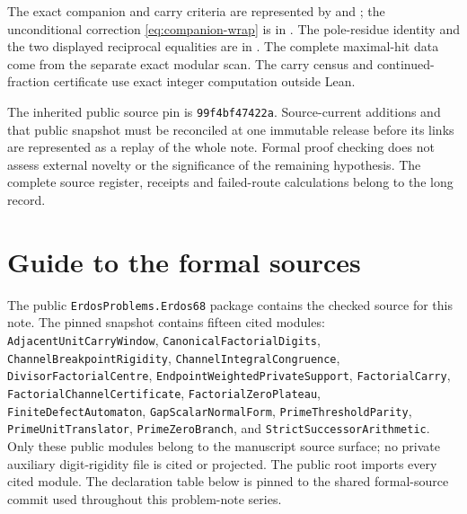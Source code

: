 \documentclass[11pt]{article}
\renewcommand{\commitshort}{99f4bf47422a}
\begin{document}
The exact companion and carry criteria are represented by
 and
; the unconditional correction
\eqref{eq:companion-wrap} is in .
The pole-residue identity and the two displayed reciprocal equalities are
in .  The complete maximal-hit data come from
the separate exact modular scan.  The carry census and continued-fraction
certificate use exact integer computation outside Lean.

The inherited public source pin is \texttt{\commitshort}.  Source-current
additions and that public snapshot must be reconciled at one immutable
release before its links are represented as a replay of the whole note.
Formal proof checking does not assess external novelty or the significance
of the remaining hypothesis.  The complete source register, receipts and
failed-route calculations belong to the long record.

\par\endgroup
\appendix
\section{Guide to the formal sources}\label{app:sources}

The public \texttt{ErdosProblems.Erdos68} package contains the checked source
for this note.  The pinned snapshot contains fifteen cited modules:
\texttt{AdjacentUnitCarryWindow},
\texttt{CanonicalFactorialDigits},
\texttt{ChannelBreakpointRigidity},
\texttt{ChannelIntegralCongruence},
\texttt{DivisorFactorialCentre},
\texttt{EndpointWeightedPrivateSupport},
\texttt{FactorialCarry},
\texttt{FactorialChannelCertificate},
\texttt{FactorialZeroPlateau},
\texttt{FiniteDefectAutomaton},
\texttt{GapScalarNormalForm},
\texttt{PrimeThresholdParity},
\texttt{PrimeUnitTranslator},
\texttt{PrimeZeroBranch}, and
\texttt{StrictSuccessorArithmetic}.
Only these public modules belong to the manuscript source surface; no private
auxiliary digit-rigidity file is cited or projected.  The public root imports
every cited module.  The declaration table below is
pinned to the shared formal-source commit used throughout this problem-note
series.
\end{document}

